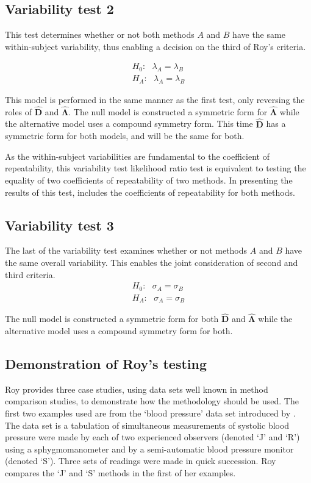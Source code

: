 \documentclass[12pt, a4paper]{article}
\theoremstyle{plain}
\theoremstyle{definition}
\theoremstyle{remark}
\begin{document}
\subsection{Variability test 2}

This test determines whether or not both methods $A$ and $B$ have the same within-subject variability, thus enabling a decision on the third of Roy's criteria.

\begin{eqnarray*}
H_{0}: \mbox{ }\lambda_{A}  = \lambda_{B} \\
H_{A}: \mbox{ }\lambda_{A}  = \lambda_{B}
\end{eqnarray*}

This model is performed in the same manner as the first test, only reversing the roles of $\boldsymbol{\hat{D}}$ and $\boldsymbol{\hat{\Lambda}}$. The null model is constructed a symmetric form for $\boldsymbol{\hat{\Lambda}}$ while the alternative model uses a compound symmetry form. This time $\boldsymbol{\hat{D}}$ has a symmetric form for both models, and will be the same for both.

As the within-subject variabilities are fundamental to the coefficient of repeatability, this variability test likelihood ratio test is equivalent to testing the equality of two coefficients of repeatability of two methods. In presenting the results of this test, \citet{roy} includes the coefficients of repeatability for both methods.

\subsection{Variability test 3}
The last of the variability test examines whether or not methods $A$ and $B$ have the same overall variability. This enables the joint consideration of second and third criteria.
\begin{eqnarray*}
H_{0}: \mbox{ }\sigma_{A}  = \sigma_{B} \\
H_{A}: \mbox{ }\sigma_{A}  = \sigma_{B}
\end{eqnarray*}

The null model is constructed a symmetric form for both $\boldsymbol{\hat{D}}$ and $\boldsymbol{\hat{\Lambda}}$ while the alternative model uses a compound symmetry form for both.

\subsection{Demonstration of Roy's testing}
Roy provides three case studies, using data sets well known in method comparison studies, to demonstrate how the methodology should be used. The first two examples used are from the `blood pressure' data set introduced by \citet{BA99}. The data set is a tabulation of simultaneous measurements of systolic blood pressure were made by each of two experienced observers (denoted `J' and `R') using a sphygmomanometer and by a semi-automatic blood pressure monitor (denoted `S'). Three sets of readings were made in quick succession. Roy compares the `J' and `S' methods in the first of her examples.
\end{document}
